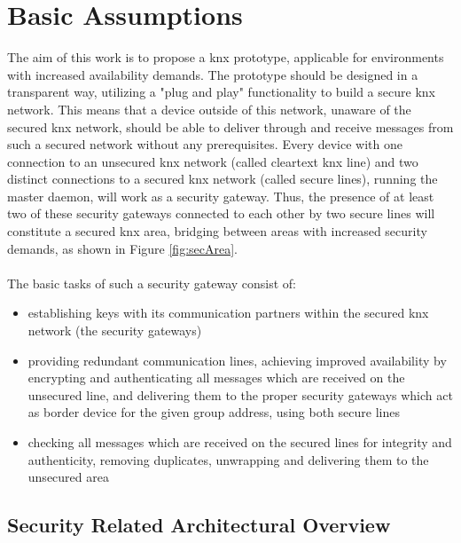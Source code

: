 \label{chap4}
\section{Basic Assumptions}

The aim of this work is to propose a \gls{knx} prototype, applicable for environments with increased availability demands.
The prototype should be designed in a transparent way, utilizing a "plug and play" functionality to build a secure \gls{knx} network.
This means that a device outside of this network, unaware of
the secured \gls{knx} network, should be able to deliver through and receive messages from such a secured network without any prerequisites. 
Every device with one connection to an unsecured \gls{knx} network (called cleartext \gls{knx} line) and two distinct connections to a secured \gls{knx}
network (called secure lines), running the master daemon, will work
as a security gateway. Thus, the presence of at least two of these security gateways connected to each other by two secure lines will constitute a 
secured \gls{knx} area, bridging between areas with increased security demands, as shown in Figure \ref{fig:secArea}.
\\
\\
The basic tasks of such a security gateway consist of:
\begin{itemize}
 \item establishing keys with its communication partners within the secured \gls{knx} network (the security gateways)
 \item providing redundant communication lines, achieving improved availability by encrypting and authenticating all messages which are received on the unsecured line, and delivering them to the proper security gateways which act as
 border device for the given group address, using both secure lines
 \item checking all messages which are received on the secured lines for integrity and authenticity, removing duplicates, unwrapping and delivering them to
 the unsecured area
\end{itemize}

\subsection{Security Related Architectural Overview}

